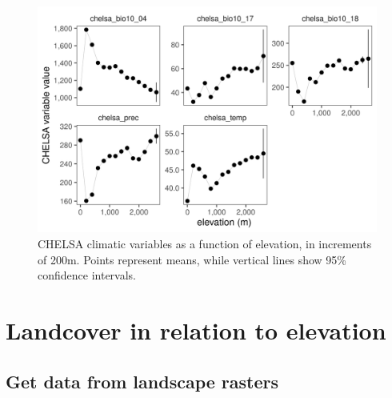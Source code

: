 \documentclass[]{article}
\newenvironment{Shaded}{}{}
\newcommand{\CommentTok}[1]{\textcolor[rgb]{0.38,0.63,0.69}{\textit{#1}}}
\newcommand{\DataTypeTok}[1]{\textcolor[rgb]{0.56,0.13,0.00}{#1}}
\newcommand{\DecValTok}[1]{\textcolor[rgb]{0.25,0.63,0.44}{#1}}
\newcommand{\KeywordTok}[1]{\textcolor[rgb]{0.00,0.44,0.13}{\textbf{#1}}}
\newcommand{\NormalTok}[1]{#1}
\newcommand{\OperatorTok}[1]{\textcolor[rgb]{0.40,0.40,0.40}{#1}}
\newcommand{\StringTok}[1]{\textcolor[rgb]{0.25,0.44,0.63}{#1}}
\begin{document}
\begin{figure}
\centering
\includegraphics{"figs/fig_climate_elev.png"}
\caption{CHELSA climatic variables as a function of elevation, in increments of 200m. Points represent means, while vertical lines show 95\% confidence intervals.}
\end{figure}

\hypertarget{landcover-in-relation-to-elevation}{%
\section{Landcover in relation to elevation}\label{landcover-in-relation-to-elevation}}

\hypertarget{get-data-from-landscape-rasters}{%
\subsection{Get data from landscape rasters}\label{get-data-from-landscape-rasters}}

\begin{Shaded}
\end{Shaded}
\end{document}
